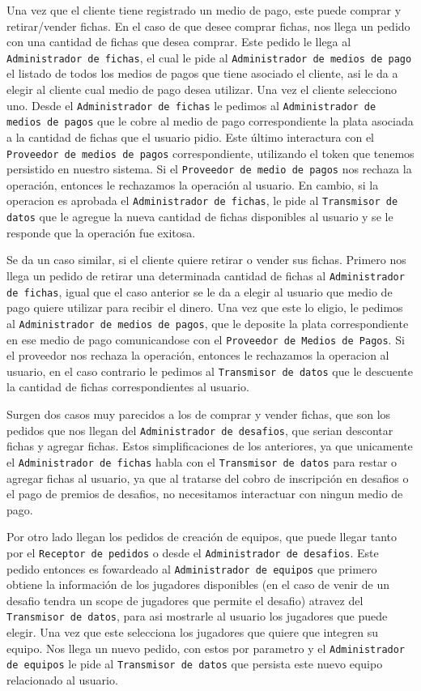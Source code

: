 Una vez que el cliente tiene registrado un medio de pago, este puede comprar y retirar/vender fichas. En el caso de que desee comprar fichas, nos llega un pedido con una cantidad de fichas que desea comprar. Este pedido le llega al \texttt{Administrador de fichas}, el cual le pide al \texttt{Administrador de medios de pago} el listado de todos los medios de pagos que tiene asociado el cliente, asi le da a elegir al cliente cual medio de pago desea utilizar. Una vez el cliente selecciono uno. Desde el \texttt{Administrador de fichas} le pedimos al \texttt{Administrador de medios de pagos} que le cobre al medio de pago correspondiente la plata asociada a la cantidad de fichas que el usuario pidio. Este último interactura con el \texttt{Proveedor de medios de pagos} correspondiente, utilizando el token que tenemos persistido en nuestro sistema. Si el \texttt{Proveedor de medio de pagos} nos rechaza la operación, entonces le rechazamos la operación al usuario. En cambio, si la operacion es aprobada el \texttt{Administrador de fichas}, le pide al \texttt{Transmisor de datos} que le agregue la nueva cantidad de fichas disponibles al usuario y se le responde que la operación fue exitosa.

Se da un caso similar, si el cliente quiere retirar o vender sus fichas. Primero nos llega un pedido de retirar una determinada cantidad de fichas al \texttt{Administrador de fichas}, igual que el caso anterior se le da a elegir al usuario que medio de pago quiere utilizar para recibir el dinero. Una vez que este lo eligio, le pedimos al \texttt{Administrador de medios de pagos}, que le deposite la plata correspondiente en ese medio de pago comunicandose con el \texttt{Proveedor de Medios de Pagos}. Si el proveedor nos rechaza la operación, entonces le rechazamos la operacion al usuario, en el caso contrario le pedimos al \texttt{Transmisor de datos} que le descuente la cantidad de fichas correspondientes al usuario.

Surgen dos casos muy parecidos a los de comprar y vender fichas, que son los pedidos que nos llegan del \texttt{Administrador de desafios}, que serian descontar fichas y agregar fichas. Estos simplificaciones de los anteriores, ya que unicamente el \texttt{Administrador de fichas} habla con el \texttt{Transmisor de datos} para restar o agregar fichas al usuario, ya que al tratarse del cobro de inscripción en desafios o el pago de premios de desafios, no necesitamos interactuar con ningun medio de pago.

Por otro lado llegan los pedidos de creación de equipos, que puede llegar tanto por el \texttt{Receptor de pedidos} o desde el \texttt{Administrador de desafios}. Este pedido entonces es fowardeado al \texttt{Administrador de equipos} que primero obtiene la información de los jugadores disponibles (en el caso de venir de un desafio tendra un scope de jugadores que permite el desafio) atravez del \texttt{Transmisor de datos}, para asi mostrarle al usuario los jugadores que puede elegir. Una vez que este selecciona los jugadores que quiere que integren su equipo. Nos llega un nuevo pedido, con estos por parametro y el \texttt{Administrador de equipos} le pide al \texttt{Transmisor de datos} que persista este nuevo equipo relacionado al usuario.


